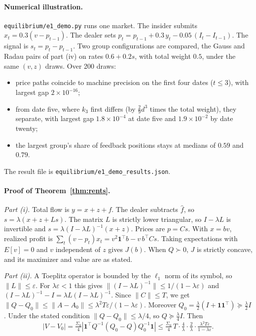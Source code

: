 \documentclass[12pt]{article}
\theoremstyle{definition}
\theoremstyle{remark}
\begin{document}
\paragraph{Numerical illustration.} \nolinkurl{equilibrium/e1_demo.py} runs one market. The insider submits $x_t=0.3(v-p_{t-1})$. The dealer sets $p_t=p_{t-1}+0.3\,y_t-0.05\,(I_t-I_{t-1})$. The signal is $s_t=p_t-p_{t-1}$. Two group configurations are compared, the Gauss and Radau pairs of part (iv) on rates $0.6+0.2s$, with total weight $0.5$, under the same $(v,z)$ draws. Over 200 draws:
\begin{itemize}[itemsep=1pt,topsep=2pt]
\item price paths coincide to machine precision on the first four dates ($t\le3$), with largest gap $2\times10^{-16}$;
\item from date five, where $k_3$ first differs (by $\tfrac29d^3$ times the total weight), they separate, with largest gap $1.8\times10^{-4}$ at date five and $1.9\times10^{-2}$ by date twenty;
\item the largest group's share of feedback positions stays at medians of $0.59$ and $0.79$.
\end{itemize}
The result file is \nolinkurl{equilibrium/e1_demo_results.json}.

\paragraph{Proof of Theorem~\ref{thm:rents}.}
\emph{Part (i).} Total flow is $y=x+z+f$. The dealer subtracts $\hat f$, so $s=\lambda(x+z+Ls)$. The matrix $L$ is strictly lower triangular, so $I-\lambda L$ is invertible and $s=\lambda(I-\lambda L)^{-1}(x+z)$. Prices are $p=Cs$. With $x=bv$, realized profit is $\sum_t(v-p_t)x_t=v^2\mathbf1^\top b-v\,b^\top Cs$. Taking expectations with $E[v]=0$ and $v$ independent of $z$ gives $J(b)$. When $Q\succ0$, $J$ is strictly concave, and its maximizer and value are as stated.

\emph{Part (ii).} A Toeplitz operator is bounded by the $\ell_1$ norm of its symbol, so $\|L\|\le\varepsilon$. For $\lambda\varepsilon<1$ this gives $\|(I-\lambda L)^{-1}\|\le1/(1-\lambda\varepsilon)$ and $(I-\lambda L)^{-1}-I=\lambda L(I-\lambda L)^{-1}$. Since $\|C\|\le T$, we get $\|Q-Q_0\|\le\|A-A_0\|\le\lambda^2T\varepsilon/(1-\lambda\varepsilon)$. Moreover $Q_0=\tfrac\lambda2(I+\mathbf1\mathbf1^\top)\succeq\tfrac\lambda2I$. Under the stated condition $\|Q-Q_0\|\le\lambda/4$, so $Q\succeq\tfrac\lambda4I$. Then
\[
|V-V_0|=\tfrac{\Sigma_0}4|\mathbf1^\top Q^{-1}(Q_0-Q)Q_0^{-1}\mathbf1|\le\tfrac{\Sigma_0}4\,T\cdot\tfrac4\lambda\cdot\tfrac2\lambda\cdot\tfrac{\lambda^2T\varepsilon}{1-\lambda\varepsilon}.
\]
\end{document}
